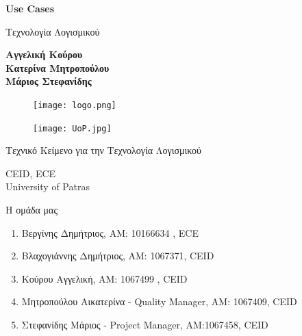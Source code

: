 \documentclass{article}
\begin{document}

\begin{titlepage}
   \begin{center}
       \vspace*{1cm}

       \textbf{\huge Use Cases}

       \vspace{0.5cm}
        Τεχνολογία Λογισμικού
            
       \vspace{1cm}

       \textbf{Αγγελική Κούρου\\Κατερίνα Μητροπούλου\\Μάριος Στεφανίδης}
       
       \begin{figure}[!htb]
        \centering
        \texttt{[image: logo.png]}
        \end{figure}
        
        \vspace{0.5cm}
        
        \begin{figure}[!htb]
        \centering
        \texttt{[image: UoP.jpg]}
        \end{figure}


       \vfill
            
       Τεχνικό Κείμενο για την Τεχνολογία Λογισμικού\\
            
       \vspace{0.5cm}
            
       CEID, ECE\\
       University of Patras\\
            
   \end{center}
\end{titlepage}



\noindent Η ομάδα μας

\begin{enumerate}
  \item Βεργίνης Δημήτριος, ΑΜ: 10166634 , ECE
  \item Βλαχογιάννης Δημήτριος, ΑΜ: 1067371, CEID
  \item Κούρου Αγγελική, ΑΜ: 1067499 , CEID
  \item Μητροπούλου Αικατερίνα - Quality Manager, ΑΜ: 1067409, CEID
  \item Στεφανίδης Μάριος - Project Manager, ΑΜ:1067458, CEID
\end{enumerate}
\end{document}
